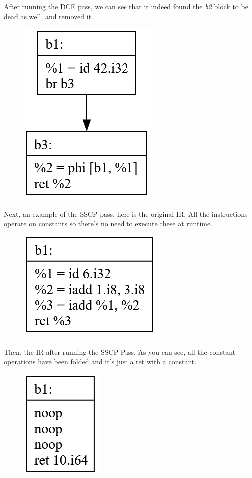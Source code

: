 \documentclass[11pt, a4paper, titlepage]{article}
\begin{document}
After running the DCE pass, we can see that it indeed found the \textit{b2} block to be dead as well, and removed it.

\begin{figure}[H]
  \centering
  \includegraphics[scale=0.3]{images/i8.png}
\end{figure}

Next, an example of the SSCP pass, here is the original IR. All the instructions operate on constants so there's no need to execute these at runtime.

\begin{figure}[H]
  \centering
  \includegraphics[scale=0.3]{images/i9.png}
\end{figure}

Then, the IR after running the SSCP Pass. As you can see, all the constant operations have been folded and it's just a ret with a constant.

\begin{figure}[H]
  \centering
  \includegraphics[scale=0.3]{images/i10.png}
\end{figure}
\end{document}
